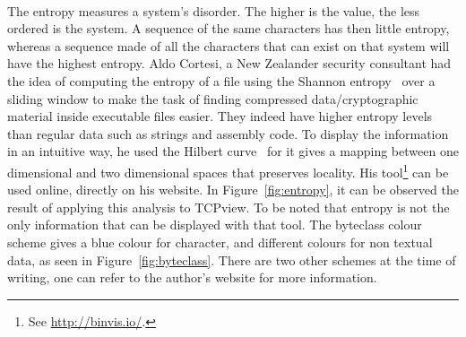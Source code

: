\paragraph{}
The entropy measures a system's disorder. The higher is the value, the less ordered is the system. A sequence of the same characters has then little entropy, whereas a sequence made of all the characters that can exist on that system will have the highest entropy. Aldo Cortesi, a New Zealander security consultant had the idea of computing the entropy of a file using the Shannon entropy~\cite{shannon1951prediction} over a sliding window to make the task of finding compressed data/cryptographic material inside executable files easier. They indeed have higher entropy levels than regular data such as strings and assembly code. To display the information in an intuitive way, he used the Hilbert curve~\cite{voorhies1991space} for it gives a mapping between one dimensional and two dimensional spaces that preserves locality. His tool\footnote{See \url{http://binvis.io/}.} can be used online, directly on his website. In Figure~\ref{fig:entropy}, it can be observed the result of applying this analysis to TCPview. To be noted that entropy is not the only information that can be displayed with that tool. The byteclass colour scheme gives a blue colour for character, and different colours for non textual data, as seen in Figure~\ref{fig:byteclass}. There are two other schemes at the time of writing, one can refer to the author's website for more information.

